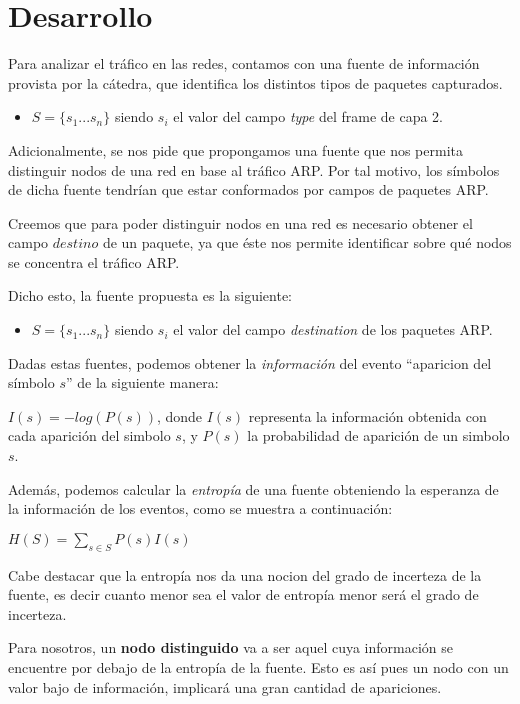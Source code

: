 \section{Desarrollo}

Para analizar el tráfico en las redes, contamos con una fuente de información provista por la cátedra, que identifica los distintos tipos de paquetes capturados.

\begin{itemize}
\item $S=\{s_1 ... s_n\}$ siendo $s_i$ el valor del campo \textit{type} del frame de capa 2.
\end{itemize}

Adicionalmente, se nos pide que propongamos una fuente que nos permita distinguir nodos de una red en base al tráfico ARP. Por tal motivo, los símbolos de dicha fuente tendrían que estar conformados por campos de paquetes ARP.

Creemos que para poder distinguir nodos en una red es necesario obtener el campo $destino$ de un paquete, ya que éste nos permite identificar sobre qué nodos se concentra el tráfico ARP.

Dicho esto, la fuente propuesta es la siguiente:

\begin{itemize}
\item $S=\{s_1 ... s_n\}$ siendo $s_i$ el valor del campo \textit{destination} de los paquetes ARP.
\end{itemize}


Dadas estas fuentes, podemos obtener la \textit{información} del evento ``aparicion del símbolo $s$'' de la siguiente manera:

$I(s) = -log(P(s))$, donde $I(s)$ representa la información obtenida con cada aparición del simbolo $s$, y $P(s)$ la probabilidad de aparición de un simbolo $s$.

Además, podemos calcular la \textit{entropía} de una fuente obteniendo la esperanza de la información de los eventos, como se muestra a continuación:

$H(S) = \sum_{s \in S} P(s) I(s)$

Cabe destacar que la entropía nos da una nocion del grado de incerteza de la fuente, es decir cuanto menor sea el valor de entropía menor será el grado de incerteza. 

Para nosotros, un \textbf{nodo distinguido} va a ser aquel cuya información se encuentre por debajo de la entropía de la fuente. Esto es así pues un nodo con un valor bajo de información, implicará una gran cantidad de apariciones.


